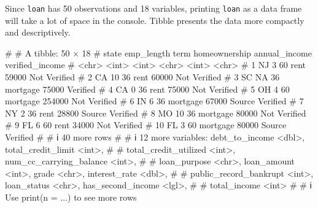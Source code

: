 \documentclass[
  letterpaper,
  DIV=11,
  numbers=noendperiod]{scrreprt}
\newenvironment{Shaded}{\begin{snugshade}}{\end{snugshade}}
\newcommand{\CommentTok}[1]{\textcolor[rgb]{0.37,0.37,0.37}{#1}}
\begin{document}
\begin{tcolorbox}[enhanced jigsaw, colbacktitle=quarto-callout-tip-color!10!white, opacitybacktitle=0.6, breakable, left=2mm, leftrule=.75mm, toprule=.15mm, toptitle=1mm, bottomtitle=1mm, colframe=quarto-callout-tip-color-frame, opacityback=0, coltitle=black, arc=.35mm, titlerule=0mm, colback=white, bottomrule=.15mm, title=\textcolor{quarto-callout-tip-color}{\faLightbulb}\hspace{0.5em}{Answer}, rightrule=.15mm]

Since \texttt{loan} has 50 observations and 18 variables, printing
\texttt{loan} as a data frame will take a lot of space in the console.
Tibble presents the data more compactly and descriptively.

\begin{Shaded}
\begin{Highlighting}[]
\CommentTok{\# \# A tibble: 50 × 18}
\CommentTok{\#    state emp\_length  term homeownership annual\_income verified\_income}
\CommentTok{\#    \textless{}chr\textgreater{}      \textless{}int\textgreater{} \textless{}int\textgreater{} \textless{}chr\textgreater{}                 \textless{}int\textgreater{} \textless{}chr\textgreater{}          }
\CommentTok{\#  1 NJ             3    60 rent                  59000 Not Verified   }
\CommentTok{\#  2 CA            10    36 rent                  60000 Not Verified   }
\CommentTok{\#  3 SC            NA    36 mortgage              75000 Verified       }
\CommentTok{\#  4 CA             0    36 rent                  75000 Not Verified   }
\CommentTok{\#  5 OH             4    60 mortgage             254000 Not Verified   }
\CommentTok{\#  6 IN             6    36 mortgage              67000 Source Verified}
\CommentTok{\#  7 NY             2    36 rent                  28800 Source Verified}
\CommentTok{\#  8 MO            10    36 mortgage              80000 Not Verified   }
\CommentTok{\#  9 FL             6    60 rent                  34000 Not Verified   }
\CommentTok{\# 10 FL             3    60 mortgage              80000 Source Verified}
\CommentTok{\# \# ℹ 40 more rows}
\CommentTok{\# \# ℹ 12 more variables: debt\_to\_income \textless{}dbl\textgreater{}, total\_credit\_limit \textless{}int\textgreater{},}
\CommentTok{\# \#   total\_credit\_utilized \textless{}int\textgreater{}, num\_cc\_carrying\_balance \textless{}int\textgreater{},}
\CommentTok{\# \#   loan\_purpose \textless{}chr\textgreater{}, loan\_amount \textless{}int\textgreater{}, grade \textless{}chr\textgreater{}, interest\_rate \textless{}dbl\textgreater{},}
\CommentTok{\# \#   public\_record\_bankrupt \textless{}int\textgreater{}, loan\_status \textless{}chr\textgreater{}, has\_second\_income \textless{}lgl\textgreater{},}
\CommentTok{\# \#   total\_income \textless{}int\textgreater{}}
\CommentTok{\# \# ℹ Use \textasciigrave{}print(n = ...)\textasciigrave{} to see more rows}
\end{Highlighting}
\end{Shaded}

\end{tcolorbox}
\end{document}

